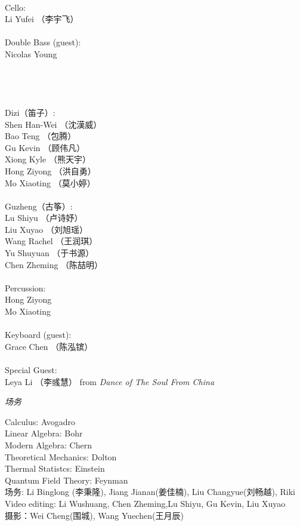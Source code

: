 \documentclass[letter,6pt,poets]{ConcProg}
\begin{document}
\begin{spacing}{1.0}
\begin{multicols}{2}
\\
Cello:\\
Li Yufei （李宇飞）\\
\\
Double Bass (guest):\\
Nicolas Young\\
\\
\\
\\
\\
Dizi（笛子）: 				 \\    
Shen Han-Wei		（沈漢威）     \\
Bao Teng  （包腾）\\
Gu Kevin   （顾伟凡）               \\
Xiong Kyle （熊天宇）\\
Hong Ziyong （洪自勇）\\
Mo Xiaoting （莫小婷）\\
\\
Guzheng（{古筝}）:\\
Lu Shiyu （卢诗妤）\\
Liu Xuyao  （刘旭瑶）\\               
Wang Rachel （王润琪） \\
Yu Shuyuan   （于书源）\\
Chen Zheming  （陈喆明）\\
\\
Percussion:\\
Hong Ziyong \\
Mo Xiaoting \\
\\
Keyboard (guest):\\
Grace Chen （陈泓镔）
\\
\\
Special Guest:\\
Leya Li （李彧慧）
 \footnotesize{ from } \emph{ Dance of The Soul From China}
\\
\end{multicols}
\begin{center}
\Large\textsl{ 场务}
\end{center}
\begin{multicols}{2}%
Calculus: Avogadro\\
Linear Algebra: Bohr\\
Modern Algebra: Chern\\
Theoretical Mechanics: Dolton\\
Thermal Statistcs: Einstein\\
Quantum Field Theory: Feynman\\
场务: Li Binglong (李秉隆), Jiang Jianan(姜佳楠), Liu Changyue(刘畅越), Riki\\
Video editing: Li Wushuang, Chen Zheming,Lu Shiyu, Gu Kevin, Liu Xuyao\\
摄影：Wei Cheng(围城), Wang Yuechen(王月辰)\\




\end{multicols}
\end{spacing}
\end{document}
